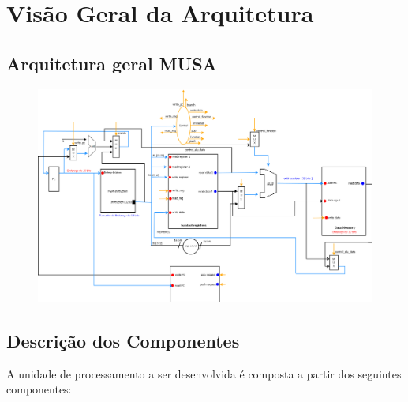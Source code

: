 \documentclass{report}
\begin{document}
\chapter{Visão Geral da Arquitetura}
  \section{Arquitetura geral MUSA}
  \begin{figure}[H]
	\centering
	\includegraphics[width=\linewidth]{./pictures/datapath/DataPath.png}
  \end{figure}  

  \section{Descrição dos Componentes}
  A unidade de processamento a ser desenvolvida é composta a partir dos seguintes componentes:
  
\end{document}
